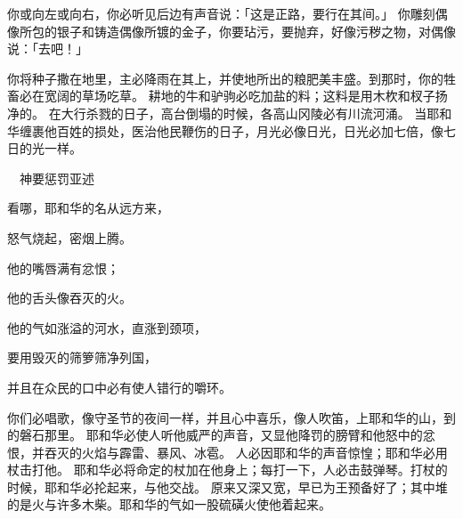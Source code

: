 {你或向左或向右，你必听见后边有声音说：「这是正路，要行在其间。」
你雕刻偶像所包的银子和铸造偶像所镀的金子，你要玷污，要抛弃，好像污秽之物，对偶像说：「去吧！」
\par }{\PP {}你将种子撒在地里，主必降雨在其上，并使地所出的粮肥美丰盛。到那时，你的牲畜必在宽阔的草场吃草。
耕地的牛和驴驹必吃加盐的料；这料是用木杴和杈子扬净的。
在大行杀戮的日子，高台倒塌的时候，各高山冈陵必有川流河涌。
当耶和华缠裹他百姓的损处，医治他民鞭伤的日子，月光必像日光，日光必加七倍，像七日的光一样。
\par }{\SH 　神要惩罚亚述
\par }{\Q {}看哪，耶和华的名从远方来，
\par }{\Q 怒气烧起，密烟上腾。
\par }{\Q 他的嘴唇满有忿恨；
\par }{\Q 他的舌头像吞灭的火。
\par }{\Q {}他的气如涨溢的河水，直涨到颈项，
\par }{\Q 要用毁灭的筛箩筛净列国，
\par }{\Q 并且在众民的口中必有使人错行的嚼环。
\par }{\PP {}你们必唱歌，像守圣节的夜间一样，并且心中喜乐，像人吹笛，上耶和华的山，到{}的磐石那里。
耶和华必使人听他威严的声音，又显他降罚的膀臂和他怒中的忿恨，并吞灭的火焰与霹雷、暴风、冰雹。
人必因耶和华的声音惊惶；耶和华必用杖击打他。
耶和华必将命定的杖加在他身上；每打一下，人必击鼓弹琴。打杖的时候，耶和华必抡起{}来，与他交战。
原来{}又深又宽，早已为王预备好了；其中堆的是火与许多木柴。耶和华的气如一股硫磺火使他着起来。

}
